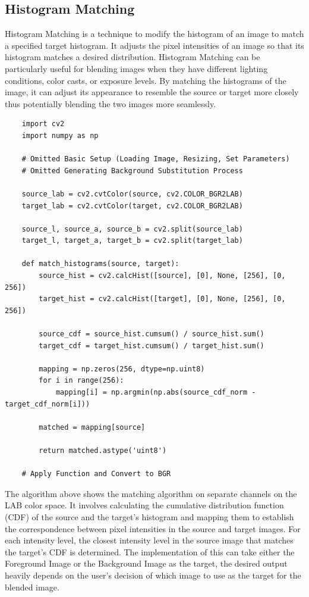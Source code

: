 \documentclass{article}
\begin{document}
\subsection{Histogram Matching}

Histogram Matching is a technique to modify the histogram of an image to match a specified target histogram. It adjusts the pixel intensities of an image so that its histogram matches a desired distribution. Histogram Matching can be particularly useful for blending images when they have different lighting conditions, color casts, or exposure levels. By matching the histograms of the image, it can adjust its appearance to resemble the source or target more closely thus potentially blending the two images more seamlessly.

\begin{verbatim}
    import cv2
    import numpy as np

    # Omitted Basic Setup (Loading Image, Resizing, Set Parameters)
    # Omitted Generating Background Substitution Process

    source_lab = cv2.cvtColor(source, cv2.COLOR_BGR2LAB)
    target_lab = cv2.cvtColor(target, cv2.COLOR_BGR2LAB)

    source_l, source_a, source_b = cv2.split(source_lab)
    target_l, target_a, target_b = cv2.split(target_lab)

    def match_histograms(source, target):
        source_hist = cv2.calcHist([source], [0], None, [256], [0, 256])
        target_hist = cv2.calcHist([target], [0], None, [256], [0, 256])
    
        source_cdf = source_hist.cumsum() / source_hist.sum()
        target_cdf = target_hist.cumsum() / target_hist.sum()
    
        mapping = np.zeros(256, dtype=np.uint8)
        for i in range(256):
            mapping[i] = np.argmin(np.abs(source_cdf_norm - target_cdf_norm[i]))
    
        matched = mapping[source]
    
        return matched.astype('uint8')
    
    # Apply Function and Convert to BGR

\end{verbatim}

The algorithm above shows the matching algorithm on separate channels on the LAB color space. It involves calculating the cumulative distribution function (CDF) of the source and the target's histogram and mapping them to establish the correspondence between pixel intensities in the source and target images. For each intensity level, the closest intensity level in the source image that matches the target's CDF is determined. The implementation of this can take either the Foreground Image or the Background Image as the target, the desired output heavily depends on the user's decision of which image to use as the target for the blended image. 
\end{document}
